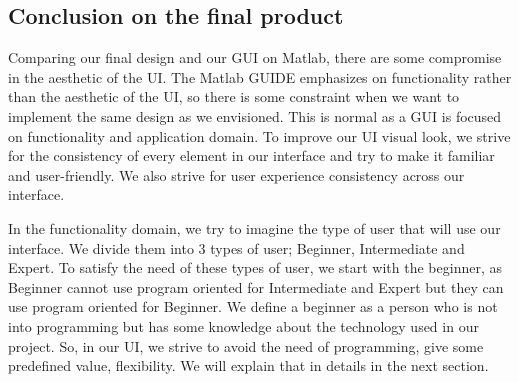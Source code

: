 \documentclass[12pt,a4paper]{article}
\begin{document}
\subsection{Conclusion on the final product}
\par \vspace{0.25cm}Comparing our final design and our GUI on Matlab, there are some compromise in the aesthetic of the UI. The Matlab GUIDE emphasizes on functionality rather than the aesthetic of the UI, so there is some constraint when we want to implement the same design as we envisioned. This is normal as a GUI is focused on functionality and application domain. To improve our UI visual look, we strive for the consistency of every element in our interface and try to make it familiar and user-friendly. We also strive for user experience consistency across our interface.
\par \vspace{0.25cm}In the functionality domain, we try to imagine the type of user that will use our interface. We divide them into 3 types of user; Beginner, Intermediate and Expert. To satisfy the need of these types of user, we start with the beginner, as Beginner cannot use program oriented for Intermediate and Expert but they can use program oriented for Beginner. We define a beginner as a person who is not into programming but has some knowledge about the technology used in our project. So, in our UI, we strive to avoid the need of programming, give some predefined value, flexibility. We will explain that in details in the next section.  
\end{document}
